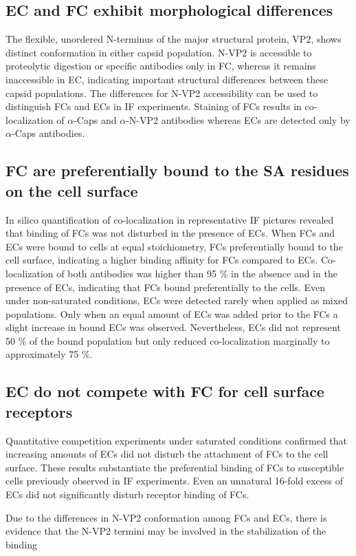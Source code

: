 \subsection{EC and FC exhibit morphological differences}
The flexible, unordered N-terminus of the major structural protein, VP2, shows distinct conformation in either capsid population. N-VP2 is accessible to proteolytic digestion or specific antibodies only in FC, whereas it remains inaccessible in EC, indicating important structural differences between these capsid populations. The differences for N-VP2 accessibility can be used to distinguish FCs and ECs in IF experiments. Staining of FCs results in co-localization of $\alpha$-Caps and $\alpha$-N-VP2 antibodies whereas ECs are detected only by $\alpha$-Caps antibodies.   

    


\subsection{FC are preferentially bound to the SA residues on the cell surface}
In silico quantification of co-localization in representative IF pictures revealed that binding of FCs was not disturbed in the presence of ECs. When FCs and ECs were bound to cells at equal stoichiometry, FCs preferentially bound to the cell surface, indicating a higher binding affinity for FCs compared to ECs. Co-localization of both antibodies was higher than 95 \% in the absence and in the presence of ECs, indicating that FCs bound preferentially to the cells. Even under non-saturated conditions, ECs were detected rarely when applied as mixed populations. Only when an equal amount of ECs was added prior to the FCs a slight increase in bound ECs was observed. Nevertheless, ECs did not represent 50 \% of the bound population but only reduced co-localization marginally to approximately 75 \%.           

\subsection{EC do not compete with FC for cell surface receptors}
Quantitative competition experiments under saturated conditions confirmed that increasing amounts of ECs did not disturb the attachment of FCs to the cell surface. These results substantiate the preferential binding of FCs to susceptible cells previously observed in IF experiments. Even an unnatural 16-fold excess of ECs did not significantly disturb receptor binding of FCs. 


Due to the differences in N-VP2 conformation among FCs and ECs, there is evidence that the N-VP2 termini may be involved in the stabilization of the binding   


\renewcommand\thefigure{\thechapter.\arabic{figure}} 


